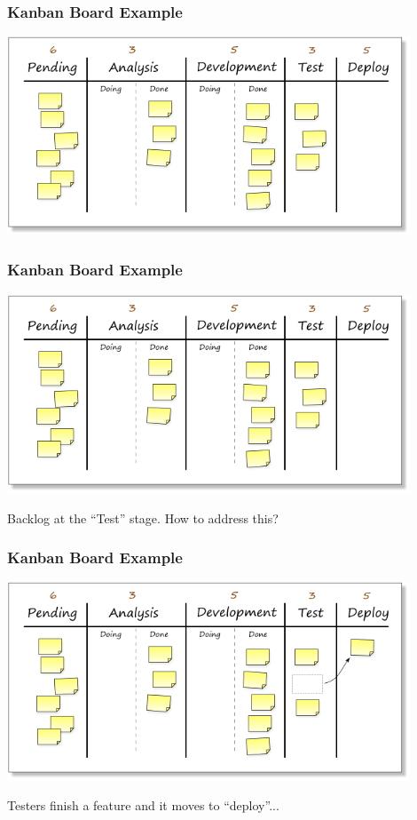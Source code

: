 \begin{frame}
\frametitle{Kanban Board Example}
\begin{center}
\includegraphics[width=0.9\textwidth]{images/kanban-board-1.png}
\end{center}
\end{frame}

\begin{frame}
\frametitle{Kanban Board Example}
\begin{center}
\includegraphics[width=0.9\textwidth]{images/kanban-board-1.png}
\end{center}

Backlog at the ``Test'' stage. How to address this? 

\end{frame}

\begin{frame}
\frametitle{Kanban Board Example}
\begin{center}
\includegraphics[width=0.9\textwidth]{images/kanban-board-2.png}
\end{center}
Testers finish a feature and it moves to ``deploy''...
\end{frame}

